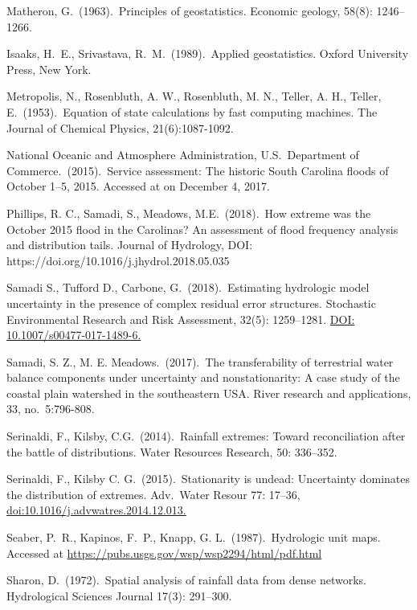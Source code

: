 \documentclass{svjour3}
\begin{document}
\begin{thebibliography}{9}
Matheron, G.\ (1963).\ Principles of geostatistics.
Economic geology, 58(8): 1246--1266.

Isaaks, H.\ E., Srivastava, R.\ M.\ (1989).\ Applied geostatistics.
Oxford University Press, New York.

Metropolis, N., Rosenbluth, A. W., Rosenbluth, M. N., Teller, A. H., Teller, E.\ (1953).\
Equation of state calculations by fast computing machines.
The Journal of Chemical Physics, 21(6):1087-1092.

National Oceanic and Atmosphere Administration, U.S.\ Department of Commerce.\ (2015).\
Service assessment: The historic South Carolina floods of October 1--5, 2015.
Accessed at  on December 4, 2017.

\bibitem{phillips}
Phillips, R. C., Samadi, S., Meadows, M.E.\ (2018).\ How extreme was the October 2015 flood in the Carolinas?
An assessment of flood frequency analysis and distribution tails.
Journal of Hydrology, DOI: https://doi.org/10.1016/j.jhydrol.2018.05.035

\bibitem{samadi2}
Samadi S., Tufford D., Carbone, G.\ (2018).\
Estimating hydrologic model uncertainty in the presence of complex residual error structures.
Stochastic Environmental Research and Risk Assessment, 32(5): 1259--1281. \url{DOI: 10.1007/s00477-017-1489-6.}

\bibitem{samadi}
Samadi, S. Z.,  M. E. Meadows.\ (2017).\
The transferability of terrestrial water balance components under uncertainty and nonstationarity:
A case study of the coastal plain watershed in the southeastern USA\@.
River research and applications, 33, no.\ 5:796-808.

\bibitem{reviewer2}
Serinaldi, F., Kilsby, C.G.\ (2014).\
Rainfall extremes: Toward reconciliation after the battle of distributions.
Water Resources Research, 50: 336--352.

\bibitem{seaber}
Serinaldi, F.,  Kilsby C. G.\ (2015).\
Stationarity is undead: Uncertainty dominates the distribution of extremes.
Adv.\ Water Resour 77: 17--36, \url{doi:10.1016/j.advwatres.2014.12.013.}

Seaber, P.\ R., Kapinos, F.\ P.,  Knapp, G. L.\ (1987).\ Hydrologic unit maps.
Accessed at \url{https://pubs.usgs.gov/wsp/wsp2294/html/pdf.html}

\bibitem{new24}
Sharon, D.\ (1972).\ Spatial analysis of rainfall data from dense networks.
 Hydrological Sciences Journal 17(3): 291--300.


\end{thebibliography}
\end{document}
